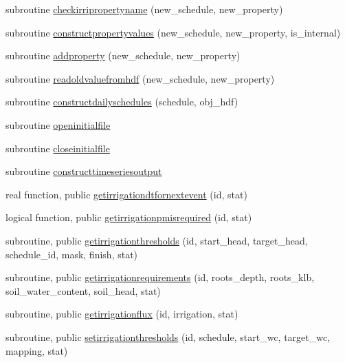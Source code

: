 \begin{DoxyCompactItemize}
subroutine \mbox{\hyperlink{namespacemoduleirrigation_a13b8da4174e7efc86d8f045b78cd51fe}{checkirripropertyname}} (new\+\_\+schedule, new\+\_\+property)
\item 
subroutine \mbox{\hyperlink{namespacemoduleirrigation_afc426b9dbadbb0d592b750d75f2bedfc}{constructpropertyvalues}} (new\+\_\+schedule, new\+\_\+property, is\+\_\+internal)
\item 
subroutine \mbox{\hyperlink{namespacemoduleirrigation_a992b40277b2c8bae0924d2f8aa1534ec}{addproperty}} (new\+\_\+schedule, new\+\_\+property)
\item 
subroutine \mbox{\hyperlink{namespacemoduleirrigation_a27adbd031b4482b018dcd962be92a681}{readoldvaluefromhdf}} (new\+\_\+schedule, new\+\_\+property)
\item 
subroutine \mbox{\hyperlink{namespacemoduleirrigation_af6e24627c25064683d994b7a6fc66c6d}{constructdailyschedules}} (schedule, obj\+\_\+hdf)
\item 
subroutine \mbox{\hyperlink{namespacemoduleirrigation_a2334c75854146c9d46127bcb0e0c54f2}{openinitialfile}}
\item 
subroutine \mbox{\hyperlink{namespacemoduleirrigation_a8b1ff94a2633495022dd8e0f95fd56a6}{closeinitialfile}}
\item 
subroutine \mbox{\hyperlink{namespacemoduleirrigation_af6d787a11912e264ab8d53cc1b691f1c}{constructtimeseriesoutput}}
\item 
real function, public \mbox{\hyperlink{namespacemoduleirrigation_aa24ee945c35012ad9d3790d40cbd02ab}{getirrigationdtfornextevent}} (id, stat)
\item 
logical function, public \mbox{\hyperlink{namespacemoduleirrigation_a051749a8f8467229fbb8e6e300b32c9d}{getirrigationpmisrequired}} (id, stat)
\item 
subroutine, public \mbox{\hyperlink{namespacemoduleirrigation_a64c49f7b68195826fe0693bf10d5cc26}{getirrigationthresholds}} (id, start\+\_\+head, target\+\_\+head, schedule\+\_\+id, mask, finish, stat)
\item 
subroutine, public \mbox{\hyperlink{namespacemoduleirrigation_a23127929f74fe2c391dc8ddec9c8d44d}{getirrigationrequirements}} (id, roots\+\_\+depth, roots\+\_\+klb, soil\+\_\+water\+\_\+content, soil\+\_\+head, stat)
\item 
subroutine, public \mbox{\hyperlink{namespacemoduleirrigation_affdb4d2e7e0c67d2c459ff6596babad9}{getirrigationflux}} (id, irrigation, stat)
\item 
subroutine, public \mbox{\hyperlink{namespacemoduleirrigation_a7a8a56e2b5c74ba0280ecb4abe6cc726}{setirrigationthresholds}} (id, schedule, start\+\_\+wc, target\+\_\+wc, mapping, stat)

\end{DoxyCompactItemize}
